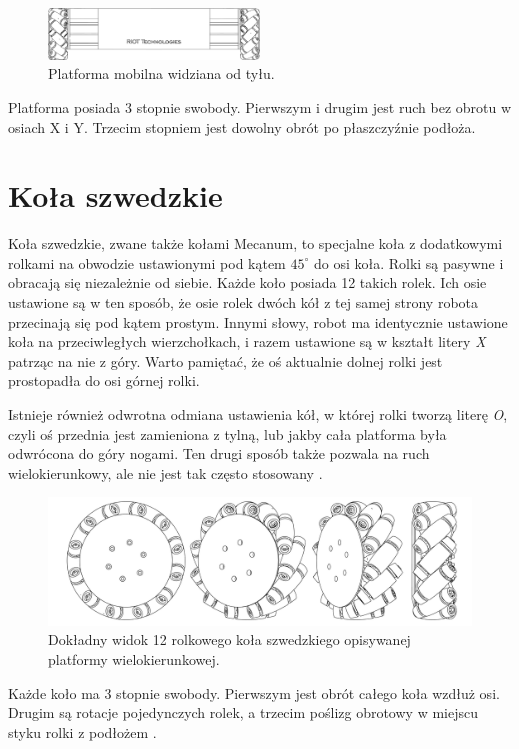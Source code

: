 \begin{figure}[H]
\centering
 \includegraphics[width=0.5\textwidth]{graphics/base_front.pdf}
\caption{Platforma mobilna widziana od tyłu.}
\end{figure} 

Platforma posiada 3 stopnie swobody. Pierwszym i drugim jest ruch bez obrotu w osiach X i Y.
Trzecim stopniem jest dowolny obrót po płaszczyźnie podłoża.

\section{Koła szwedzkie}
Koła szwedzkie, zwane także kołami Mecanum, to specjalne koła z dodatkowymi rolkami na obwodzie ustawionymi pod kątem $45^\circ$ do osi koła.
Rolki są pasywne i obracają się niezależnie od siebie. Każde koło posiada 12 takich rolek.
Ich osie ustawione są w ten sposób, że osie rolek dwóch kół z tej samej strony robota przecinają się pod kątem prostym.
Innymi słowy, robot ma identycznie ustawione koła na przeciwległych wierzchołkach, i razem ustawione są w kształt litery \emph{X} patrząc na nie z góry.
Warto pamiętać, że oś aktualnie dolnej rolki jest prostopadła do osi górnej rolki.

Istnieje również odwrotna odmiana ustawienia kół, w której rolki tworzą literę \emph{O}, czyli oś przednia jest zamieniona z tylną, lub jakby cała platforma była odwrócona do góry nogami.
Ten drugi sposób także pozwala na ruch wielokierunkowy, ale nie jest tak często stosowany \cite{paletobot}.

\begin{figure}[H]
\centering
 \includegraphics[width=\textwidth]{graphics/wheel.pdf}
\caption{Dokładny widok 12 rolkowego koła szwedzkiego opisywanej platformy wielokierunkowej.}
\end{figure} 

Każde koło ma 3 stopnie swobody. Pierwszym jest obrót całego koła wzdłuż osi.
Drugim są rotacje pojedynczych rolek, a trzecim poślizg obrotowy w miejscu styku rolki z podłożem \cite{kinematic_modeling}.

